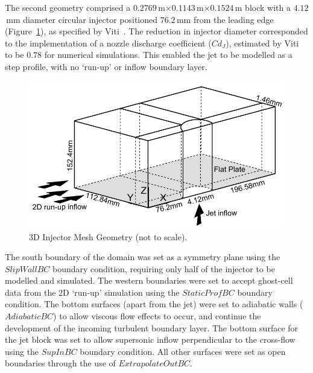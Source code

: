 The second geometry comprised a $0.2769$\,m$\times0.1143$\,m$\times0.1524$\,m block with a $4.12$\,mm diameter circular injector positioned $76.2$\,mm from the leading edge (Figure~\ref{f:tc3:coordinates}), as specified by Viti~\cite{schetz2009}. The reduction in injector diameter corresponded to the implementation of a nozzle discharge coefficient ($Cd_J$), estimated by Viti~\cite{viti2002} to be $0.78$ for numerical simulations. This enabled the jet to be modelled as a step profile, with no `run-up' or inflow boundary layer.
%
\begin{figure}[htbp]
 \begin{center}
  \includegraphics[width=14cm]{./chap8-3Dinjector/figs/inject-blocks.pdf}
  \caption{3D Injector Mesh Geometry (not to scale).}
  \label{f:tc3:coordinates}
 \end{center}
\end{figure}
%

The south boundary of the domain was set as a symmetry plane using the $SlipWallBC$ boundary condition, requiring only half of the injector to be modelled and simulated. The western boundaries were set to accept ghost-cell data from the 2D `run-up' simulation using the $StaticProfBC$ boundary condition. The bottom surfaces (apart from the jet) were set to adiabatic walls ($AdiabaticBC$) to allow viscous flow effects to occur, and continue the development of the incoming turbulent boundary layer. The bottom surface for the jet block was set to allow supersonic inflow perpendicular to the cross-flow using the $SupInBC$ boundary condition. All other surfaces were set as open boundaries through the use of $ExtrapolateOutBC$. 

